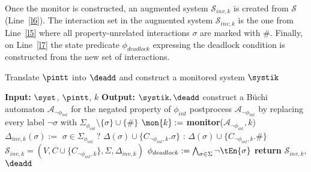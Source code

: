 Once the monitor is constructed, an augmented system $\mathcal{S}_{inv,k}$ is
created from $\mathcal{S}$ (Line~\ref{l6}). The interaction set in the
augmented system $\mathcal{S}_{inv,k}$ is the one from Line~\ref{l5}
where all property-unrelated interactions $\sigma$ are marked with
$\#$. Finally, on Line~\ref{l7} the state predicate $\phi_{deadlock}$
expressing the deadlock condition is constructed from the new set of
interactions.
\vspace*{.3cm}
\begin{algorithm}
\vspace*{.1cm}
\caption{Translate $\pintt$ into $\deadd$ and construct a monitored system $\systik$}\label{alg:int}
\vspace*{.1cm}
\vspace*{.1cm}
\begin{algorithmic}[1]
\Statex \textbf{Input: }$\syst$, $\pintt$, $k$
\Statex \textbf{Output: }$\systik, \deadd$
\vspace*{.1cm}
\State construct a B\"uchi automaton $\mathcal{A}_{\neg\phi_{int}}$ for the negated property of  $\phi_{int}$\label{l1}
\State postprocess $\mathcal{A}_{\neg\phi_{int}}$ by replacing every label $\neg \sigma$ with $\Sigma_{\phi_{int}}\setminus \{\sigma\} \cup \{\#\}$\label{l2}
\State $\mon{k} := $ \textbf{monitor}($\mathcal{A}_{\neg\phi_{int}}, k$) 
\label{l3}
\State $\Delta_{inv,k}(\sigma):=$ {$\sigma \in \Sigma_{\phi_{int}}$} ? {$\Delta(\sigma)\cup\{C_{\neg\phi_{int},k}.\sigma\}$} : {$\Delta(\sigma)\cup\{C_{\neg\phi_{int},k}.\#\}$} \label{l5}
\State $\mathcal{S}_{inv,k} = (V, C\cup \{C_{\neg\phi_{int},k}\}, \Sigma, \Delta_{inv,k})$ \label{l6}
\State $\phi_{deadlock} :=\bigwedge_{\sigma  \in \Sigma} \neg \tEn{\sigma}$  \label{l7}
\State \textbf{return } $\mathcal{S}_{inv,k}$, \text{ } $\deadd$
\end{algorithmic}
\end{algorithm}
